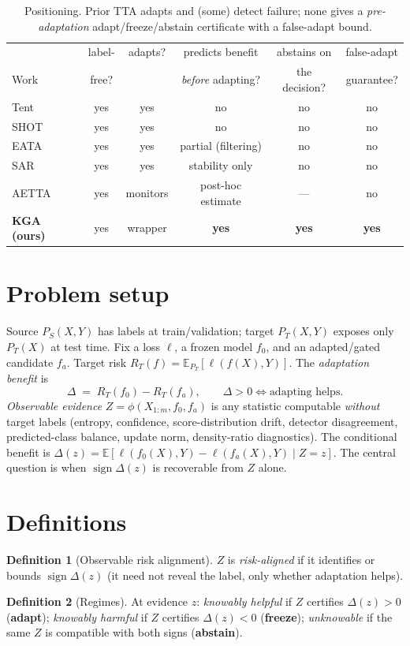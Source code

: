 \documentclass[11pt]{article}
\theoremstyle{plain}
\theoremstyle{definition}
\newtheorem{definition}{Definition}
\newcommand{\E}{\mathbb{E}}
\newcommand{\sign}{\operatorname{sign}}
\begin{document}
\begin{table}[h]\centering\small
\begin{tabular}{lccccc}
\toprule
 & label- & adapts? & predicts benefit & abstains on & false-adapt \\
Work & free? & & \emph{before} adapting? & the decision? & guarantee? \\
\midrule
Tent & yes & yes & no & no & no \\
SHOT & yes & yes & no & no & no \\
EATA & yes & yes & partial (filtering) & no & no \\
SAR & yes & yes & stability only & no & no \\
AETTA & yes & monitors & post-hoc estimate & --- & no \\
\textbf{KGA (ours)} & yes & wrapper & \textbf{yes} & \textbf{yes} & \textbf{yes} \\
\bottomrule
\end{tabular}
\caption{Positioning. Prior TTA adapts and (some) detect failure; none gives a
\emph{pre-adaptation} adapt/freeze/abstain certificate with a false-adapt bound.}
\label{tab:rel}
\end{table}

\section{Problem setup}\label{sec:setup}
Source $P_S(X,Y)$ has labels at train/validation; target $P_T(X,Y)$ exposes only
$P_T(X)$ at test time. Fix a loss $\ell$, a frozen model $f_0$, and an
adapted/gated candidate $f_a$. Target risk $R_T(f)=\E_{P_T}[\ell(f(X),Y)]$.
The \emph{adaptation benefit} is
\begin{equation}
\Delta \;=\; R_T(f_0)-R_T(f_a),\qquad \Delta>0 \iff \text{adapting helps.}
\end{equation}
\emph{Observable evidence} $Z=\phi(X_{1:m},f_0,f_a)$ is any statistic computable
\emph{without} target labels (entropy, confidence, score-distribution drift,
detector disagreement, predicted-class balance, update norm, density-ratio
diagnostics). The conditional benefit is $\Delta(z)=\E[\ell(f_0(X),Y)-\ell(f_a(X),Y)\mid Z=z]$.
The central question is when $\sign\Delta(z)$ is recoverable from $Z$ alone.

\section{Definitions}\label{sec:def}
\begin{definition}[Observable risk alignment]
$Z$ is \emph{risk-aligned} if it identifies or bounds $\sign\Delta(z)$ (it need not
reveal the label, only whether adaptation helps).
\end{definition}
\begin{definition}[Regimes]
At evidence $z$: \emph{knowably helpful} if $Z$ certifies $\Delta(z)>0$ (\textbf{adapt});
\emph{knowably harmful} if $Z$ certifies $\Delta(z)<0$ (\textbf{freeze});
\emph{unknowable} if the same $Z$ is compatible with both signs (\textbf{abstain}).
\end{definition}
\end{document}
